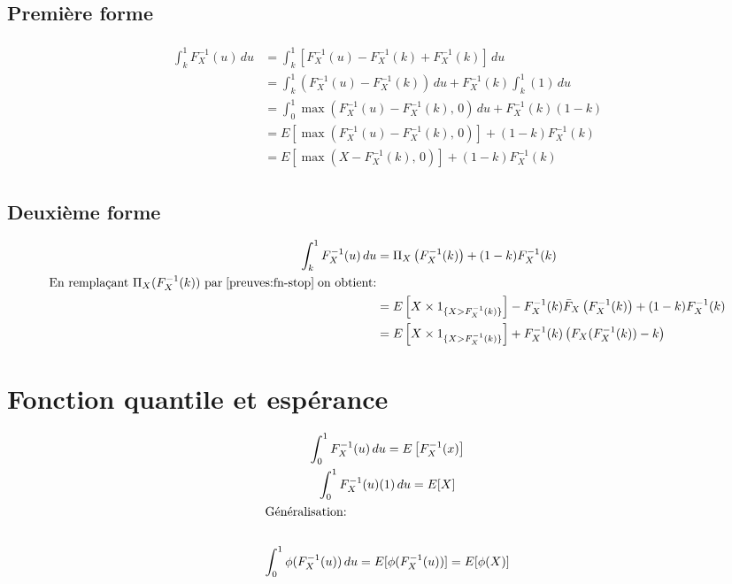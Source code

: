 \documentclass[]{book}
\theoremstyle{definition}
\theoremstyle{definition}
\theoremstyle{definition}
\theoremstyle{remark}
\begin{document}
\subsection{Première forme}\label{intro:fn-quantile:1}

\begin{gather*}
\begin{align*}
\int_k^1 F_X^{-1}(u)\,du& =\int_k^1 \left[F_X^{-1}(u)-F_X^{-1}(k)+F_X^{-1}(k)\right]\,du\\
& =\int_k^1\left(F_X^{-1}(u)-F_X^{-1}(k)\right)\,du + F_X^{-1}(k)\int_k^1 (1)\,du\\
& =\int_0^1\max\left(F_X^{-1}(u)-F_X^{-1}(k),\, 0\right)\, du + F_X^{-1}(k)(1-k)\\
& = E\left[\max(F_X^{-1}(u)-F_X^{-1}(k),\, 0)\right]+(1-k)F_X^{-1}(k)\\
& = E\left[\max(X-F_X^{-1}(k),\, 0)\right]+(1-k)F_X^{-1}(k)
\end{align*}
\end{gather*}

\subsection{Deuxième forme}\label{intro:fn-quantile:2}

\begin{gather*}
\begin{align*}
\int_k^1 F_X^{-1}(u)\, du& =\Pi_X\left(F_X^{-1}(k)\right)+(1-k)F_X^{-1}(k)\\
\text{En remplaçant $\Pi_X(F_X^{-1}(k))$ par}\; \ref{preuves:fn-stop}\;\text{on obtient:}\\
& =E\left[X \times \mathrm{1}_{\{X > F_X^{-1}(k)\}}\right]-F_X^{-1}(k)\bar{F}_X\left(F_X^{-1}(k)\right)+(1-k)F_X^{-1}(k)\\
& =E\left[X \times \mathrm{1}_{\{X > F_X^{-1}(k)\}}\right]+F_X^{-1}(k)\left(F_X(F_X^{-1}(k))-k\right)
\end{align*}
\end{gather*}

\section{Fonction quantile et espérance}\label{fn-et-Ex}

\begin{gather*}
\int_0^1 F_X^{-1}(u)\,du =E\left[F_X^{-1}(x)\right]\\
\int_0^1 F_X^{-1} (u)(1)\,du = E[X]\\
\intertext{Généralisation:}\\
\int_0^1 \phi(F_X^{-1}(u))\,du =E[\phi(F_X^{-1}(u))] =E[\phi(X)]
\end{gather*}
\end{document}
